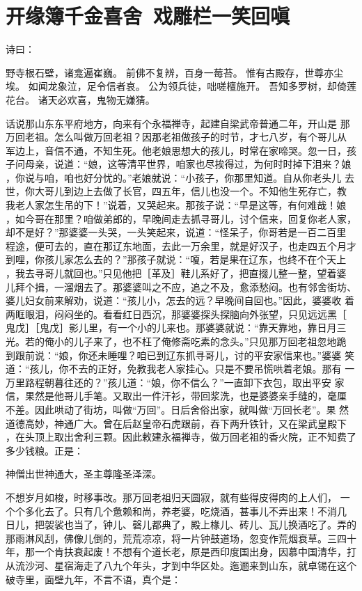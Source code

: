 \chapter{开缘簿千金喜舍~戏雕栏一笑回嗔}

诗曰：

野寺根石壁，诸龛遍崔巍。
前佛不复辨，百身一莓苔。
惟有古殿存，世尊亦尘埃。
如闻龙象泣，足令信者哀。
公为领兵徒，咄嗟檀施开。
吾知多罗树，却倚莲花台。
诸天必欢喜，鬼物无嫌猜。

话说那山东东平府地方，向来有个永福禅寺，起建自梁武帝普通二年，开山是
那万回老祖。怎么叫做万回老祖？因那老祖做孩子的时节，才七八岁，有个哥儿从
军边上，音信不通，不知生死。他老娘思想大的孩儿，时常在家啼哭。忽一日，孩
子问母亲，说道：“娘，这等清平世界，咱家也尽挨得过，为何时时掉下泪来？娘
，你说与咱，咱也好分忧的。”老娘就说：“小孩子，你那里知道。自从你老头儿
去世，你大哥儿到边上去做了长官，四五年，信儿也没一个。不知他生死存亡，教
我老人家怎生吊的下！”说着，又哭起来。那孩子说：“早是这等，有何难哉！娘
，如今哥在那里？咱做弟郎的，早晚间走去抓寻哥儿，讨个信来，回复你老人家，
却不是好？”那婆婆一头哭，一头笑起来，说道：“怪呆子，你哥若是一百二百里
程途，便可去的，直在那辽东地面，去此一万余里，就是好汉子，也走四五个月才
到哩，你孩儿家怎么去的？”那孩子就说：“嗄，若是果在辽东，也终不在个天上
，我去寻哥儿就回也。”只见他把［革及］鞋儿系好了，把直掇儿整一整，望着婆
儿拜个揖，一溜烟去了。那婆婆叫之不应，追之不及，愈添愁闷。也有邻舍街坊、
婆儿妇女前来解劝，说道：“孩儿小，怎去的远？早晚间自回也。”因此，婆婆收
着两眶眼泪，闷闷坐的。看看红日西沉，那婆婆探头探脑向外张望，只见远远黑［
鬼戊］［鬼戊］影儿里，有一个小的儿来也。那婆婆就说：“靠天靠地，靠日月三
光。若的俺小的儿子来了，也不枉了俺修斋吃素的念头。”只见那万回老祖忽地跪
到跟前说：“娘，你还未睡哩？咱已到辽东抓寻哥儿，讨的平安家信来也。”婆婆
笑道：“孩儿，你不去的正好，免教我老人家挂心。只是不要吊慌哄着老娘。那有
一万里路程朝暮往还的？”孩儿道：“娘，你不信么？”一直卸下衣包，取出平安
家信，果然是他哥儿手笔。又取出一件汗衫，带回浆洗，也是婆婆亲手缝的，毫厘
不差。因此哄动了街坊，叫做“万回”。日后舍俗出家，就叫做“万回长老”。果
然道德高妙，神通广大。曾在后赵皇帝石虎跟前，吞下两升铁针，又在梁武皇殿下
，在头顶上取出舍利三颗。因此敕建永福禅寺，做万回老祖的香火院，正不知费了
多少钱粮。正是：

神僧出世神通大，圣主尊隆圣泽深。

不想岁月如梭，时移事改。那万回老祖归天圆寂，就有些得皮得肉的上人们，
一个个多化去了。只有几个惫赖和尚，养老婆，吃烧酒，甚事儿不弄出来！不消几
日儿，把袈裟也当了，钟儿、磬儿都典了，殿上椽儿、砖儿、瓦儿换酒吃了。弄的
那雨淋风刮，佛像儿倒的，荒荒凉凉，将一片钟鼓道场，忽变作荒烟衰草。三四十
年，那一个肯扶衰起废！不想有个道长老，原是西印度国出身，因慕中国清华，打
从流沙河、星宿海走了八九个年头，才到中华区处。迤逦来到山东，就卓锡在这个
破寺里，面壁九年，不言不语，真个是：

